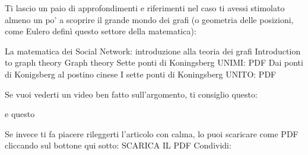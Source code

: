 Ti lascio un paio di approfondimenti e riferimenti nel caso ti avessi stimolato almeno un po’ a scoprire il grande mondo dei grafi (o geometria delle posizioni, come Eulero definì questo settore della matematica):

    La matematica dei Social Network: introduzione alla teoria dei grafi 
    Introduction to graph theory
    Graph theory
    Sette ponti di Koningsberg UNIMI: PDF
    Dai ponti di Konigsberg al postino cinese
    I sette ponti di Koningsberg UNITO: PDF

Se vuoi vederti un video ben fatto sull’argomento, ti consiglio questo:

e questo

 

Se invece ti fa piacere rileggerti l’articolo con calma, lo puoi scaricare come PDF cliccando sul bottone qui sotto:
SCARICA IL PDF
Condividi: